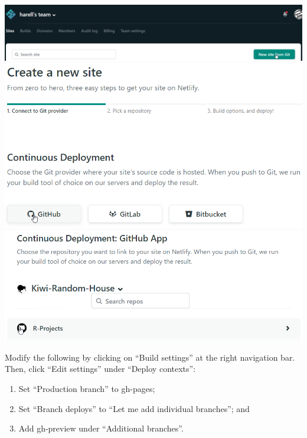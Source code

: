 \documentclass[]{book}
\providecommand{\tightlist}{%
  \setlength{\itemsep}{0pt}\setlength{\parskip}{0pt}}
\begin{document}
\begin{center}\includegraphics[width=0.7\linewidth]{images/db5b10aba61256bb01d9731ac2cd0830} \includegraphics[width=0.7\linewidth]{images/75b90a0fdcfbad8c4cea92c8c0ba013a} \includegraphics[width=0.7\linewidth]{images/3be8c926bcd3b95f738a64ca8193c3e8} \end{center}

Modify the following by clicking on ``Build settings'' at the right navigation
bar. Then, click ``Edit settings'' under ``Deploy contexts'':

\begin{enumerate}
\def\labelenumi{\arabic{enumi}.}
\tightlist
\item
  Set ``Production branch'' to gh-pages;
\item
  Set ``Branch deploys'' to ``Let me add individual branches''; and
\item
  Add gh-preview under ``Additional branches''.
\end{enumerate}
\end{document}
